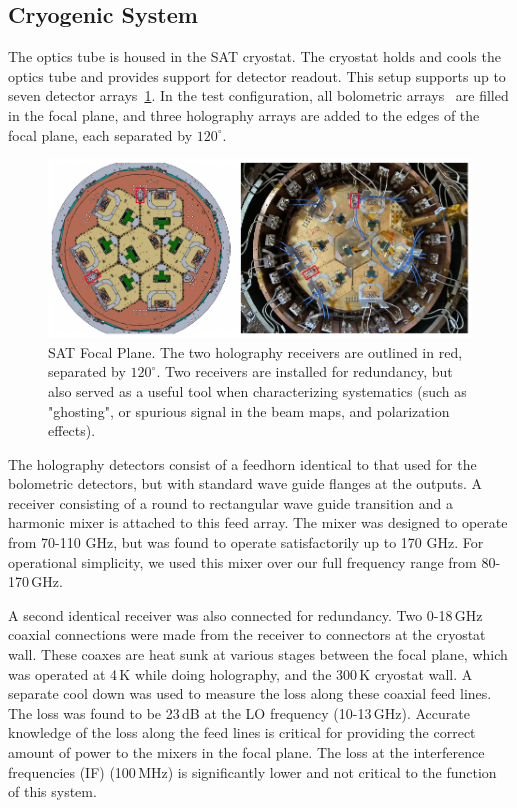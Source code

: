 \subsection{Cryogenic System}
\label{sec:sat_cryo_rec}
The optics tube is housed in the SAT cryostat\cite{2020SPIE11445E..7LK}.  The cryostat holds and cools the optics tube and provides support for detector readout.  This setup supports up to seven detector arrays~\ref{fig:sat_fpa}.   In the test configuration, all bolometric arrays~\cite{2022arXiv220104507H} are filled in the focal plane, and three holography arrays are added to the edges of the focal plane, each separated by $120^{\circ}$. 
\begin{figure}
    \centering
    \includegraphics[width = \textwidth]{Figures/sat_fpa.pdf}
    \caption{SAT Focal Plane.  The two holography receivers are outlined in red, separated by $120^{\circ}$.  Two receivers are installed for redundancy, but also served as a useful tool when characterizing systematics (such as "ghosting", or spurious signal in the beam maps, and polarization effects).}
    \label{fig:sat_fpa}
\end{figure}
The holography detectors consist of a feedhorn  identical to that used for the bolometric detectors, but with standard wave guide flanges at the outputs. A receiver consisting of a round to rectangular wave guide transition and a harmonic mixer is attached to this feed array.  The mixer was designed to operate from 70-110 GHz, but was found to operate satisfactorily up to 170 GHz. For operational simplicity, we used this mixer over our full frequency range from 80-170\,GHz.

A second identical receiver was also connected for redundancy.  Two 0-18\,GHz coaxial connections were made from the receiver to connectors at the cryostat wall.  These coaxes are heat sunk at various stages between the focal plane, which was operated at 4\,K while doing holography, and the 300\,K cryostat wall.  A separate cool down was used to measure the loss along these coaxial feed lines.  The loss  was found to be 23\,dB at the LO frequency (10-13\,GHz).  Accurate knowledge of the loss along the feed lines is critical for providing the correct amount of power to the mixers in the focal plane.  The loss at the interference frequencies (IF) (100\,MHz) is significantly lower and not critical to the function of this system.

